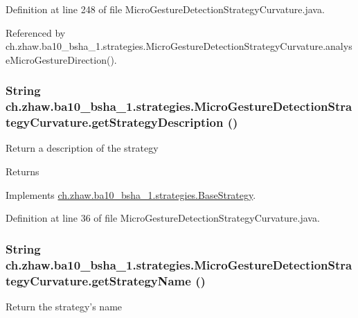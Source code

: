 Definition at line 248 of file MicroGestureDetectionStrategyCurvature.java.

Referenced by ch.zhaw.ba10\_\-bsha\_\-1.strategies.MicroGestureDetectionStrategyCurvature.analyseMicroGestureDirection().\hypertarget{classch_1_1zhaw_1_1ba10__bsha__1_1_1strategies_1_1MicroGestureDetectionStrategyCurvature_a78946977e95404053d40384e51b889e2}{
\subsubsection[{getStrategyDescription}]{\setlength{\rightskip}{0pt plus 5cm}String ch.zhaw.ba10\_\-bsha\_\-1.strategies.MicroGestureDetectionStrategyCurvature.getStrategyDescription ()}}
\label{classch_1_1zhaw_1_1ba10__bsha__1_1_1strategies_1_1MicroGestureDetectionStrategyCurvature_a78946977e95404053d40384e51b889e2}
Return a description of the strategy

\begin{DoxyReturn}{Returns}

\end{DoxyReturn}


Implements \hyperlink{classch_1_1zhaw_1_1ba10__bsha__1_1_1strategies_1_1BaseStrategy_a75fdb36932ad701f6375cc1fe718056b}{ch.zhaw.ba10\_\-bsha\_\-1.strategies.BaseStrategy}.

Definition at line 36 of file MicroGestureDetectionStrategyCurvature.java.\hypertarget{classch_1_1zhaw_1_1ba10__bsha__1_1_1strategies_1_1MicroGestureDetectionStrategyCurvature_acd5003f685af87709425848adde5bc0f}{
\subsubsection[{getStrategyName}]{\setlength{\rightskip}{0pt plus 5cm}String ch.zhaw.ba10\_\-bsha\_\-1.strategies.MicroGestureDetectionStrategyCurvature.getStrategyName ()}}
\label{classch_1_1zhaw_1_1ba10__bsha__1_1_1strategies_1_1MicroGestureDetectionStrategyCurvature_acd5003f685af87709425848adde5bc0f}
Return the strategy's name

